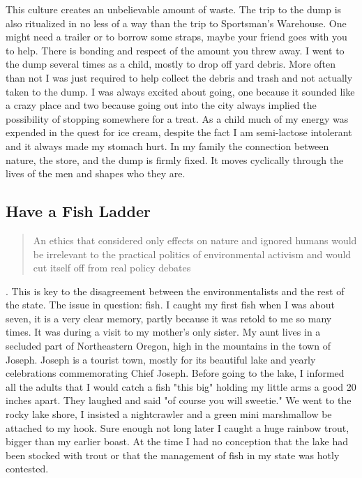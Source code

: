 \documentclass[
    a4paper,
    12pt,
    man,
    donotrepeattitle
]{apa6}
\let \cite \parencite
\begin{document}
This culture creates an unbelievable amount of waste. The trip to the dump is
also ritualized in no less of a way than the trip to Sportsman's Warehouse. One
might need a trailer or to borrow some straps, maybe your friend goes with you
to help. There is bonding and respect of the amount you threw away. I went to
the dump several times as a child, mostly to drop off yard debris. More often
than not I was just required to help collect the debris and trash and not
actually taken to the dump. I was always excited about going, one because it
sounded like a crazy place and two because going out into the city always
implied the possibility of stopping somewhere for a treat. As a child much of
my energy was expended in the quest for ice cream, despite the fact I am
semi-lactose intolerant and it always made my stomach hurt. In my family the
connection between nature, the store, and the dump is firmly fixed. It moves
cyclically through the lives of the men and shapes who they are.

\subsection{Have a Fish Ladder}

\blockquote{An ethics that considered only effects on nature and ignored humans 
would be
irrelevant to the practical politics of environmental activism and would cut
itself off from real policy debates} \cite[p. 710]{s2}. This is key to the 
disagreement
between the environmentalists and the rest of the state. The issue in question:
fish. I caught my first fish when I was about seven, it is a very clear memory,
partly because it was retold to me so many times. It was during a visit to my
mother's only sister. My aunt lives in a secluded part of Northeastern Oregon,
high in the mountains in the town of Joseph. Joseph is a tourist town, mostly
for its beautiful lake and yearly celebrations commemorating Chief Joseph.
Before going to the lake, I informed all the adults that I would catch a fish
"this big" holding my little arms a good 20 inches apart. They laughed and said
"of course you will sweetie." We went to the rocky lake shore, I insisted
a nightcrawler and a green mini marshmallow be attached to my hook. Sure enough
not long later I caught a huge rainbow trout, bigger than my earlier boast. At
the time I had no conception that the lake had been stocked with trout or that
the management of fish in my state was hotly contested.
\end{document}
